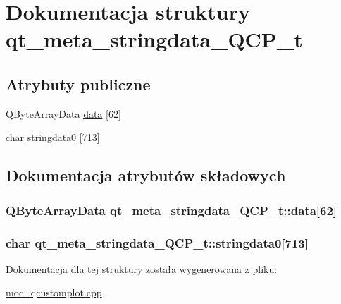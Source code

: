 \hypertarget{structqt__meta__stringdata___q_c_p__t}{}\section{Dokumentacja struktury qt\+\_\+meta\+\_\+stringdata\+\_\+\+Q\+C\+P\+\_\+t}
\label{structqt__meta__stringdata___q_c_p__t}
\subsection*{Atrybuty publiczne}
\begin{DoxyCompactItemize}
\item 
Q\+Byte\+Array\+Data \hyperlink{structqt__meta__stringdata___q_c_p__t_abc9c399ac75b9d32e347271273ccd5b6}{data} \mbox{[}62\mbox{]}
\item 
char \hyperlink{structqt__meta__stringdata___q_c_p__t_a884365a57221bf71e4c60c1e2a9fc5f2}{stringdata0} \mbox{[}713\mbox{]}
\end{DoxyCompactItemize}


\subsection{Dokumentacja atrybutów składowych}
\subsubsection[{\texorpdfstring{data}{data}}]{\setlength{\rightskip}{0pt plus 5cm}Q\+Byte\+Array\+Data qt\+\_\+meta\+\_\+stringdata\+\_\+\+Q\+C\+P\+\_\+t\+::data\mbox{[}62\mbox{]}}\hypertarget{structqt__meta__stringdata___q_c_p__t_abc9c399ac75b9d32e347271273ccd5b6}{}\label{structqt__meta__stringdata___q_c_p__t_abc9c399ac75b9d32e347271273ccd5b6}
\subsubsection[{\texorpdfstring{stringdata0}{stringdata0}}]{\setlength{\rightskip}{0pt plus 5cm}char qt\+\_\+meta\+\_\+stringdata\+\_\+\+Q\+C\+P\+\_\+t\+::stringdata0\mbox{[}713\mbox{]}}\hypertarget{structqt__meta__stringdata___q_c_p__t_a884365a57221bf71e4c60c1e2a9fc5f2}{}\label{structqt__meta__stringdata___q_c_p__t_a884365a57221bf71e4c60c1e2a9fc5f2}


Dokumentacja dla tej struktury została wygenerowana z pliku\+:\begin{DoxyCompactItemize}
\item 
\hyperlink{moc__qcustomplot_8cpp}{moc\+\_\+qcustomplot.\+cpp}\end{DoxyCompactItemize}
